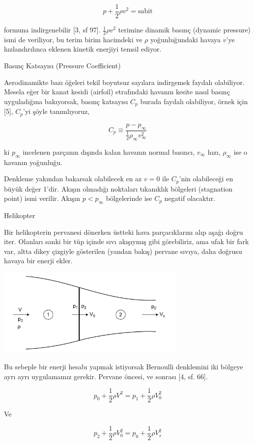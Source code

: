 \documentclass[12pt,fleqn]{article}\usepackage{../../common}
\begin{document}
$$
p + \frac{1}{2} \rho v^2 = \textrm{sabit}
$$

formuna indirgenebilir [3, sf 97]. $\frac{1}{2}\rho v^2$ terimine dinamik basınç
(dynamic pressure) ismi de veriliyor, bu terim birim hacimdeki ve $\rho$
yoğunluğundaki havaya $v$'ye hızlandırılınca eklenen kinetik enerjiyi temsil ediyor.

Basınç Katsayısı (Pressure Coefficient)

Aerodinamikte bazı öğeleri tekil boyutsuz sayılara indirgemek faydalı
olabiliyor. Mesela eğer bir kanat kesidi (airfoil) etrafındaki havanın kesite
nasıl basınç uyguladığına bakıyorsak, basınç katsayısı $C_p$ burada faydalı
olabiliyor, örnek için [5], $C_p$'yi şöyle tanımlıyoruz,

$$
C_p \equiv \frac{p - p_\infty}{\frac{1}{2} \rho_\infty v_\infty^2}
$$

ki $p_\infty$ incelenen parçanın dışında kalan havanın normal basıncı,
$v_\infty$ hızı, $\rho_\infty$ ise o havanın yoğunluğu.

Denkleme yakından bakarsak olabilecek en az $v=0$ ile $C_p$'nin olabileceği en
büyük değer 1'dir. Akışın olmadığı noktaları tıkanıklık bölgeleri (stagnation
point) ismi verilir. Akışın $p < p_\infty$ bölgelerinde ise $C_p$ negatif
olacaktır.

Helikopter

Bir helikopterin pervanesi dönerken üstteki hava parçacıklarını alıp aşağı
doğru iter. Olanları sanki bir tüp içinde sıvı akışıymış gibi görebiliriz,
ama ufak bir fark var, altta dikey çizgiyle gösterilen (yandan bakış)
pervane sıvıya, daha doğrusu havaya bir enerji ekler.

\includegraphics[width=25em]{phy_045_flight_03.png}

Bu sebeple bir enerji hesabı yapmak istiyorsak Bernoulli denklemini iki
bölgeye ayrı ayrı uygulamamız gerekir. Pervane öncesi, ve sonrası [4,
sf. 66].

$$
p_0 + \frac{1}{2} \rho V^2 = p_1 + \frac{1}{2} \rho V_0^2
$$

Ve

$$
p_2 + \frac{1}{2} \rho V_0^2 = p_0 + \frac{1}{2} \rho V_s^2
$$
\end{document}
